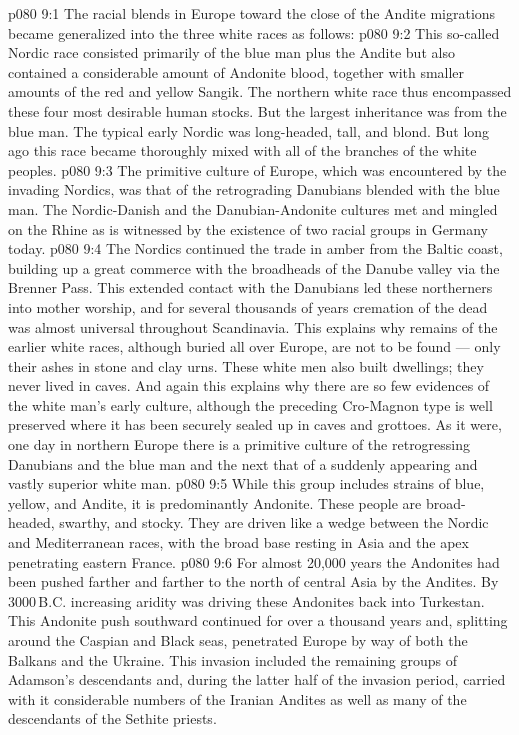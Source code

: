 \vs p080 9:1 The racial blends in Europe toward the close of the Andite migrations became generalized into the three white races as follows:
\vs p080 9:2 \bibnobreakspace {} This so\hyp{}called Nordic race consisted primarily of the blue man plus the Andite but also contained a considerable amount of Andonite blood, together with smaller amounts of the red and yellow Sangik. The northern white race thus encompassed these four most desirable human stocks. But the largest inheritance was from the blue man. The typical early Nordic was long\hyp{}headed, tall, and blond. But long ago this race became thoroughly mixed with all of the branches of the white peoples.
\vs p080 9:3 The primitive culture of Europe, which was encountered by the invading Nordics, was that of the retrograding Danubians blended with the blue man. The Nordic\hyp{}Danish and the Danubian\hyp{}Andonite cultures met and mingled on the Rhine as is witnessed by the existence of two racial groups in Germany today.
\vs p080 9:4 The Nordics continued the trade in amber from the Baltic coast, building up a great commerce with the broadheads of the Danube valley via the Brenner Pass. This extended contact with the Danubians led these northerners into mother worship, and for several thousands of years cremation of the dead was almost universal throughout Scandinavia. This explains why remains of the earlier white races, although buried all over Europe, are not to be found --- only their ashes in stone and clay urns. These white men also built dwellings; they never lived in caves. And again this explains why there are so few evidences of the white man’s early culture, although the preceding Cro\hyp{}Magnon type is well preserved where it has been securely sealed up in caves and grottoes. As it were, one day in northern Europe there is a primitive culture of the retrogressing Danubians and the blue man and the next that of a suddenly appearing and vastly superior white man.
\vs p080 9:5 \bibnobreakspace {} While this group includes strains of blue, yellow, and Andite, it is predominantly Andonite. These people are broad\hyp{}headed, swarthy, and stocky. They are driven like a wedge between the Nordic and Mediterranean races, with the broad base resting in Asia and the apex penetrating eastern France.
\vs p080 9:6 For almost 20,000 years the Andonites had been pushed farther and farther to the north of central Asia by the Andites. By 3000\,B.C. increasing aridity was driving these Andonites back into Turkestan. This Andonite push southward continued for over a thousand years and, splitting around the Caspian and Black seas, penetrated Europe by way of both the Balkans and the Ukraine. This invasion included the remaining groups of Adamson’s descendants and, during the latter half of the invasion period, carried with it considerable numbers of the Iranian Andites as well as many of the descendants of the Sethite priests.
